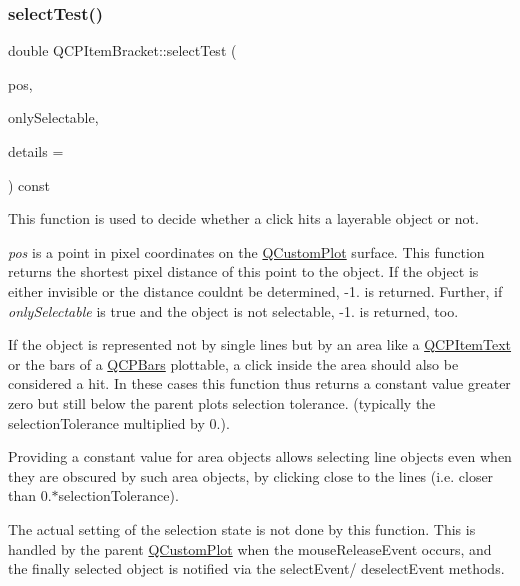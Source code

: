 \subsubsection{\texorpdfstring{selectTest()}{selectTest()}}
{\footnotesize\ttfamily double Q\+C\+P\+Item\+Bracket\+::select\+Test (\begin{DoxyParamCaption}\item[{const Q\+PointF \&}]{pos,  }\item[{bool}]{only\+Selectable,  }\item[{Q\+Variant $\ast$}]{details = {} }\end{DoxyParamCaption}) const\hspace{0.3cm}{\ttfamily [virtual]}}

This function is used to decide whether a click hits a layerable object or not.

{\itshape pos} is a point in pixel coordinates on the \mbox{\hyperlink{class_q_custom_plot}{Q\+Custom\+Plot}} surface. This function returns the shortest pixel distance of this point to the object. If the object is either invisible or the distance couldn\textquotesingle{}t be determined, -\/1. is returned. Further, if {\itshape only\+Selectable} is true and the object is not selectable, -\/1. is returned, too.

If the object is represented not by single lines but by an area like a \mbox{\hyperlink{class_q_c_p_item_text}{Q\+C\+P\+Item\+Text}} or the bars of a \mbox{\hyperlink{class_q_c_p_bars}{Q\+C\+P\+Bars}} plottable, a click inside the area should also be considered a hit. In these cases this function thus returns a constant value greater zero but still below the parent plot\textquotesingle{}s selection tolerance. (typically the selection\+Tolerance multiplied by 0.).

Providing a constant value for area objects allows selecting line objects even when they are obscured by such area objects, by clicking close to the lines (i.\+e. closer than 0.$\ast$selection\+Tolerance).

The actual setting of the selection state is not done by this function. This is handled by the parent \mbox{\hyperlink{class_q_custom_plot}{Q\+Custom\+Plot}} when the mouse\+Release\+Event occurs, and the finally selected object is notified via the select\+Event/ deselect\+Event methods.


